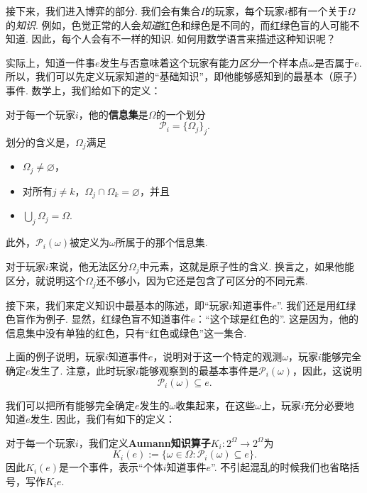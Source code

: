 接下来，我们进入博弈的部分. 我们会有集合$I$的玩家，每个玩家$i$都有一个关于$\Omega$的\emph{知识}. 例如，色觉正常的人会\emph{知道}红色和绿色是不同的，而红绿色盲的人可能不知道. 因此，每个人会有不一样的知识. 如何用数学语言来描述这种知识呢？

实际上，知道一件事$e$发生与否意味着这个玩家有能力\emph{区分}一个样本点$\omega$是否属于$e$. 所以，我们可以先定义玩家知道的“基础知识”，即他能够感知到的最基本（原子）事件. 数学上，我们给如下的定义：

\begin{definition}[信息集]
    对于每一个玩家$i$，他的\textbf{信息集}是$\Omega$的一个划分
    \[\mathcal P_i = \{\Omega_j\}_j.\]
    划分的含义是，$\Omega_j$满足
    \begin{itemize}
        \item $\Omega_j\neq \varnothing$，
        \item 对所有$j\neq k$，$\Omega_j\cap\Omega_k=\varnothing$，并且
        \item $\bigcup_j\Omega_j=\Omega$.
    \end{itemize}
    此外，$\mathcal P_i(\omega)$被定义为$\omega$所属于的那个信息集.
\end{definition}

对于玩家$i$来说，他无法区分$\Omega_j$中元素，这就是原子性的含义. 换言之，如果他能区分，就说明这个$\Omega_j$还不够小，因为它还是包含了可区分的不同元素. 

接下来，我们来定义知识中最基本的陈述，即“玩家$i$知道事件$e$”. 我们还是用红绿色盲作为例子. 显然，红绿色盲不知道事件$e$：“这个球是红色的”. 这是因为，他的信息集中没有单独的红色，只有“红色或绿色”这一集合. 

上面的例子说明，玩家$i$知道事件$e$，说明对于这一个特定的观测$\omega$，玩家$i$能够完全确定$e$发生了. 注意，此时玩家$i$能够观察到的最基本事件是$\mathcal P_i(\omega)$，因此，这说明
\[\mathcal P_i(\omega)\subseteq e.\]

我们可以把所有能够完全确定$e$发生的$\omega$收集起来，在这些$\omega$上，玩家$i$充分必要地知道$e$发生. 因此，我们有如下的定义：

\begin{definition}[Aumann知识算子]
    对于每一个玩家$i$，我们定义\textbf{Aumann知识算子}$K_i:2^\Omega\to 2^\Omega$为
    \[K_i(e):=\{\omega\in\Omega:\mathcal P_i(\omega)\subseteq e\}.\]
    因此$K_i(e)$是一个事件，表示“个体$i$知道事件$e$”. 不引起混乱的时候我们也省略括号，写作$K_ie$.
\end{definition}


